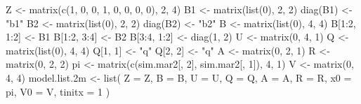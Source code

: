 \begin{Schunk}
\begin{Sinput}
 Z <- matrix(c(1, 0, 0, 1, 0, 0, 0, 0), 2, 4)
 B1 <- matrix(list(0), 2, 2)
 diag(B1) <- "b1"
 B2 <- matrix(list(0), 2, 2)
 diag(B2) <- "b2"
 B <- matrix(list(0), 4, 4)
 B[1:2, 1:2] <- B1
 B[1:2, 3:4] <- B2
 B[3:4, 1:2] <- diag(1, 2)
 U <- matrix(0, 4, 1)
 Q <- matrix(list(0), 4, 4)
 Q[1, 1] <- "q"
 Q[2, 2] <- "q"
 A <- matrix(0, 2, 1)
 R <- matrix(0, 2, 2)
 pi <- matrix(c(sim.mar2[, 2], sim.mar2[, 1]), 4, 1)
 V <- matrix(0, 4, 4)
 model.list.2m <- list(
   Z = Z, B = B, U = U, Q = Q, A = A,
   R = R, x0 = pi, V0 = V, tinitx = 1
 )
\end{Sinput}
\end{Schunk}
